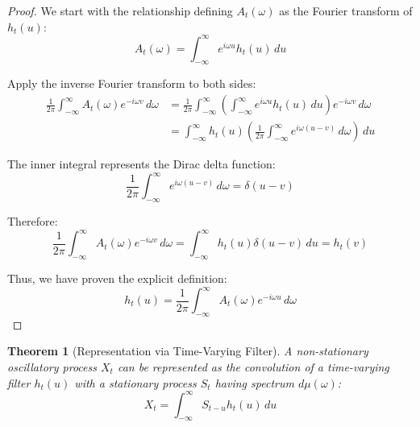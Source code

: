 \documentclass{article}
\newtheorem{theorem}{Theorem}
\theoremstyle{definition}
\begin{document}
\begin{proof}
We start with the relationship defining $A_t(\omega)$ as the Fourier transform of $h_t(u)$:
\begin{equation}
A_t(\omega) = \int_{-\infty}^{\infty} e^{i\omega u} h_t(u) \, du
\end{equation}

Apply the inverse Fourier transform to both sides:
\begin{align}
\frac{1}{2\pi}\int_{-\infty}^{\infty} A_t(\omega) e^{-i\omega v} \, d\omega &= \frac{1}{2\pi}\int_{-\infty}^{\infty} \left(\int_{-\infty}^{\infty} e^{i\omega u} h_t(u) \, du \right) e^{-i\omega v} \, d\omega \\
&= \int_{-\infty}^{\infty} h_t(u) \left(\frac{1}{2\pi}\int_{-\infty}^{\infty} e^{i\omega(u-v)} \, d\omega \right) \, du
\end{align}

The inner integral represents the Dirac delta function:
\begin{equation}
\frac{1}{2\pi}\int_{-\infty}^{\infty} e^{i\omega(u-v)} \, d\omega = \delta(u-v)
\end{equation}

Therefore:
\begin{equation}
\frac{1}{2\pi}\int_{-\infty}^{\infty} A_t(\omega) e^{-i\omega v} \, d\omega = \int_{-\infty}^{\infty} h_t(u) \delta(u-v) \, du = h_t(v)
\end{equation}

Thus, we have proven the explicit definition:
\begin{equation}
h_t(u) = \frac{1}{2\pi}\int_{-\infty}^{\infty} A_t(\omega) e^{-i\omega u} \, d\omega
\end{equation}
\end{proof}

\begin{theorem}[Representation via Time-Varying Filter]
A non-stationary oscillatory process $X_t$ can be represented as the convolution of a time-varying filter $h_t(u)$ with a stationary process $S_t$ having spectrum $d\mu(\omega)$:
\begin{equation}
X_t = \int_{-\infty}^{\infty} S_{t-u} h_t(u) \, du
\end{equation}
\end{theorem}
\end{document}
